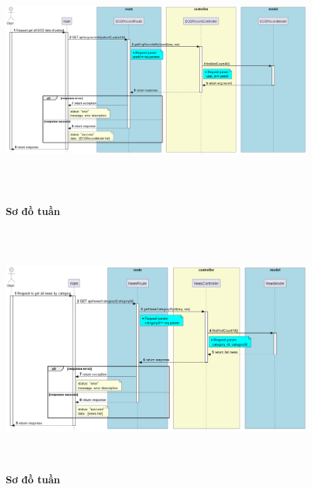 \begin{figure}[H]
  \centering
  \includegraphics[width=16cm,height=9cm]{Images/server/sequence/server/getEcgRecordsByUserId.png}
  \caption[Sơ đồ tuần tự ]{\bfseries \fontsize{12pt}{0pt}
  \selectfont Sơ đồ tuần }
  \label{hinh21} %
\end{figure}


\begin{figure}[H]
  \centering
  \includegraphics[width=16cm,height=9cm]{Images/server/sequence/server/getNewsByCategory.png}
  \caption[Sơ đồ tuần tự ]{\bfseries \fontsize{12pt}{0pt}
  \selectfont Sơ đồ tuần }
  \label{hinh21} %
\end{figure}


